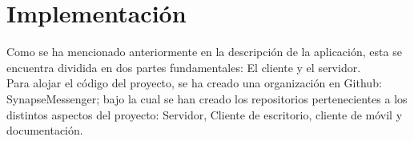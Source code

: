 \chapter{Implementación}

Como se ha mencionado anteriormente en la descripción de la aplicación, esta se encuentra dividida en dos partes fundamentales: El cliente y el servidor. \\
Para alojar el código del proyecto, se ha creado una organización en Github: SynapseMessenger; bajo la cual se han creado los repositorios pertenecientes a los distintos aspectos del proyecto: Servidor, Cliente de escritorio, cliente de móvil y documentación. \\ 